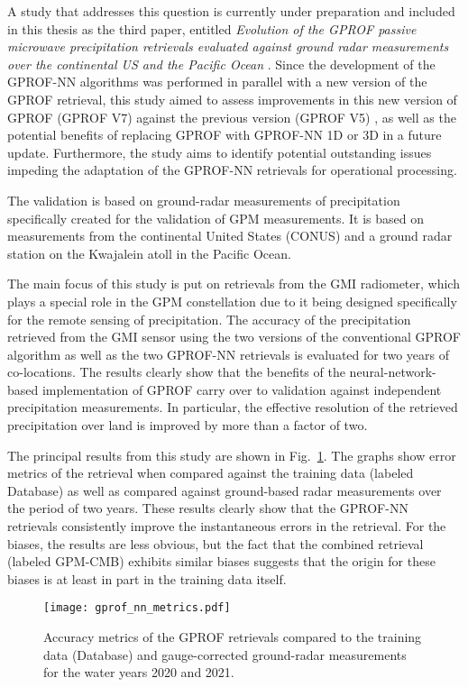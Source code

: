 A study that addresses this question is currently under preparation and included
in this thesis as the third paper, entitled \textit{%
  Evolution of the GPROF
  passive microwave precipitation retrievals evaluated against ground radar
  measurements over the continental US and the Pacific Ocean%
}. Since the
  development of the GPROF-NN algorithms was performed in parallel with a new
  version of the GPROF retrieval, this study aimed to assess improvements in
  this new version of GPROF (GPROF V7) against the previous version (GPROF V5)
  , as well as the potential benefits of replacing GPROF with GPROF-NN 1D or 3D in
  a future update. Furthermore, the study aims to identify potential outstanding
  issues impeding the adaptation of the GPROF-NN retrievals for operational
  processing.

The validation is based on ground-radar measurements of precipitation
specifically created for the validation of GPM measurements. It is
based on measurements from the continental United States (CONUS) and a ground radar
station on the Kwajalein atoll in the Pacific Ocean.

The main focus of this study is put on retrievals from the GMI radiometer, which
plays a special role in the GPM constellation due to it being designed
specifically for the remote sensing of precipitation. The accuracy of the
precipitation retrieved from the GMI sensor using the two versions of the
conventional GPROF algorithm as well as the two GPROF-NN retrievals is evaluated
for two years of co-locations. The results clearly show that the benefits of the
neural-network-based implementation of GPROF carry over to validation against
independent precipitation measurements. In particular, the effective resolution
of the retrieved precipitation over land is improved  by more than a
factor of two.

The principal results from this study are shown in
Fig.~\ref{fig:machine_learning:gprof_nn_metrics}. The graphs show error metrics
of the retrieval when compared against the training data (labeled Database) as
well as compared against ground-based radar measurements over the period of two
years. These results clearly show that the GPROF-NN retrievals consistently
improve the instantaneous errors in the retrieval. For the biases,
the results are less obvious, but the fact that the combined retrieval
(labeled GPM-CMB) exhibits similar biases suggests that the origin for these
biases is at least in part in the training data itself.

  \begin{figure}[!hbpt]
    \centering
    \texttt{[image: gprof\_nn\_metrics.pdf]}
    \caption{
      Accuracy metrics of the GPROF retrievals compared to the training data
      (Database) and gauge-corrected ground-radar measurements for the water
      years 2020 and 2021.
    }
    \label{fig:machine_learning:gprof_nn_metrics}
  \end{figure}

